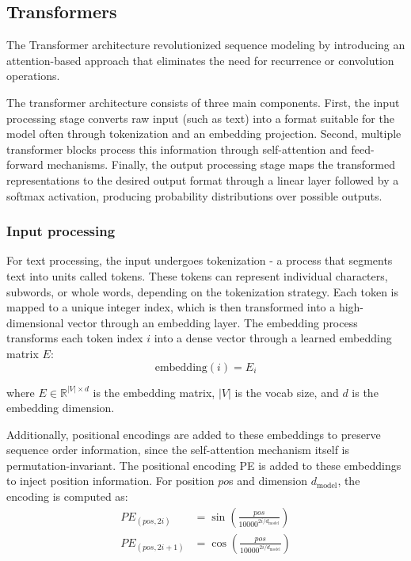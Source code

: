 \subsection{Transformers}


The Transformer architecture \cite{vaswani_attention_2017} revolutionized sequence modeling by introducing an attention-based approach that eliminates the need for recurrence or convolution operations.

The transformer architecture consists of three main components. First, the input processing stage converts raw input (such as text) into a format suitable for the model often through tokenization and an embedding projection. Second, multiple transformer blocks process this information through self-attention and feed-forward mechanisms. Finally, the output processing stage maps the transformed representations to the desired output format through a linear layer followed by a softmax activation, producing probability distributions over possible outputs.

\subsubsection{Input processing}
For text processing, the input undergoes tokenization - a process that segments text into units called tokens. These tokens can represent individual characters, subwords, or whole words, depending on the tokenization strategy. Each token is mapped to a unique integer index, which is then transformed into a high-dimensional vector through an embedding layer. The embedding process transforms each token index $i$ into a dense vector through a learned embedding matrix $E$:
\begin{equation}
\text{embedding}(i) = E_i
\end{equation}

where $E \in \mathbb{R}^{|V|\times d} $ is the embedding matrix, $|V|$ is the vocab size, and $ d $ is the embedding dimension.

Additionally, positional encodings are added to these embeddings to preserve sequence order information, since the self-attention mechanism itself is permutation-invariant. The positional encoding PE is added to these embeddings to inject position information. For position $po$s and dimension $d_{\text{model}}$, the encoding is computed as:
\begin{align}
PE_{(pos,2i)} &= \sin\left(\frac{pos}{10000^{2i/d_{\text{model}}}}\right) \\
PE_{(pos,2i+1)} &= \cos\left(\frac{pos}{10000^{2i/d_{\text{model}}}}\right)
\end{align}

